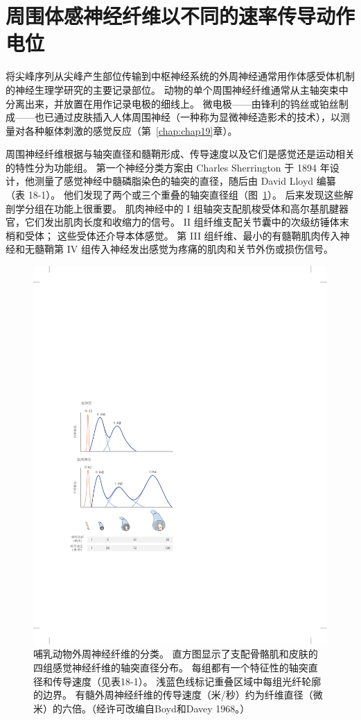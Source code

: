 


\section{周围体感神经纤维以不同的速率传导动作电位}

将尖峰序列从尖峰产生部位传输到中枢神经系统的外周神经通常用作体感受体机制的神经生理学研究的主要记录部位。
动物的单个周围神经纤维通常从主轴突束中分离出来，并放置在用作记录电极的细线上。
微电极——由锋利的钨丝或铂丝制成——也已通过皮肤插入人体周围神经（一种称为显微神经造影术的技术），以测量对各种躯体刺激的感觉反应（第~\ref{chap:chap19}章）。


周围神经纤维根据与轴突直径和髓鞘形成、传导速度以及它们是感觉还是运动相关的特性分为功能组。
第一个神经分类方案由 Charles Sherrington 于 1894 年设计，他测量了感觉神经中髓磷脂染色的轴突的直径，随后由 David Lloyd 编纂（表 18-1）。
他们发现了两个或三个重叠的轴突直径组（图~\ref{fig:18_3}）。
后来发现这些解剖学分组在功能上很重要。
肌肉神经中的 I 组轴突支配肌梭受体和高尔基肌腱器官，它们发出肌肉长度和收缩力的信号。
II 组纤维支配关节囊中的次级纺锤体末梢和受体；
这些受体还介导本体感觉。
第 III 组纤维、最小的有髓鞘肌肉传入神经和无髓鞘第 IV 组传入神经发出感觉为疼痛的肌肉和关节外伤或损伤信号。


\begin{figure}[htbp]
	\centering
	\includegraphics[width=0.5\linewidth]{chap18/fig_18_3}
	\caption{哺乳动物外周神经纤维的分类。
	直方图显示了支配骨骼肌和皮肤的四组感觉神经纤维的轴突直径分布。
	每组都有一个特征性的轴突直径和传导速度（见表18-1）。
	浅蓝色线标记重叠区域中每组光纤轮廓的边界。
	有髓外周神经纤维的传导速度（米/秒）约为纤维直径（微米）的六倍。（经许可改编自Boyd和Davey 1968。）}
	\label{fig:18_3}
\end{figure}



